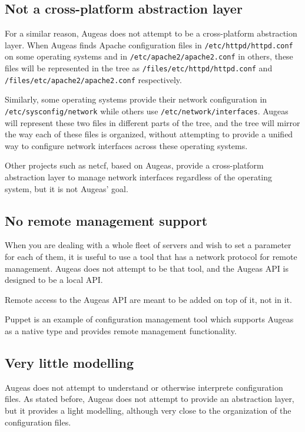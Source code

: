 \subsection{Not a cross-platform abstraction layer}

For a similar reason, Augeas does not attempt to be a cross-platform abstraction layer. When Augeas finds Apache configuration files in \nolinkurl{/etc/httpd/httpd.conf} on some operating systems and in \nolinkurl{/etc/apache2/apache2.conf} in others, these files will be represented in the tree as \nolinkurl{/files/etc/httpd/httpd.conf} and \nolinkurl{/files/etc/apache2/apache2.conf} respectively.

Similarly, some operating systems provide their network configuration in \nolinkurl{/etc/sysconfig/network} while others use \nolinkurl{/etc/network/interfaces}. Augeas will represent these two files in different parts of the tree, and the tree will mirror the way each of these files is organized, without attempting to provide a unified way to configure network interfaces across these operating systems.

Other projects such as netcf, based on Augeas, provide a cross-platform abstraction layer to manage network interfaces regardless of the operating system, but it is not Augeas' goal.

\subsection{No remote management support}

When you are dealing with a whole fleet of servers and wish to set a parameter for each of them, it is useful to use a tool that has a network protocol for remote management. Augeas does not attempt to be that tool, and the Augeas API is designed to be a local API.

Remote access to the Augeas API are meant to be added on top of it, not in it.

Puppet is an example of configuration management tool which supports Augeas as a native type and provides remote management functionality.

\subsection{Very little modelling}

Augeas does not attempt to understand or otherwise interprete configuration files. As stated before, Augeas does not attempt to provide an abstraction layer, but it provides a light modelling, although very close to the organization of the configuration files.

